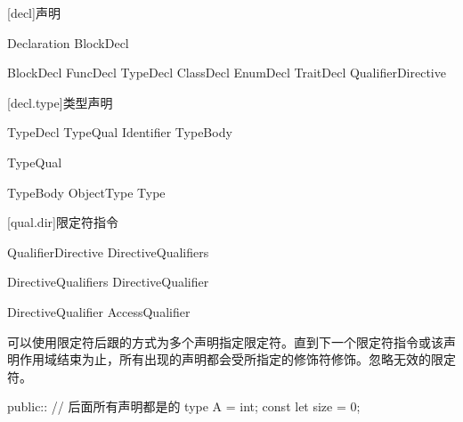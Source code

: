 
[decl]{声明}

\begin{bnf}{Declaration}
    BlockDecl
\end{bnf}

\begin{bnf}{BlockDecl}
    FuncDecl \br
    TypeDecl \br
    ClassDecl \br
    EnumDecl \br
    TraitDecl \br
    QualifierDirective
\end{bnf}

[decl.type]{类型声明}

\begin{bnf}{TypeDecl}
    TypeQual\bnfs {} Identifier TypeBody
\end{bnf}

\begin{bnf}{TypeQual}
\end{bnf}

\begin{bnf}{TypeBody}
    ObjectType \br
    \terminal{=} Type
\end{bnf}

[qual.dir]{限定符指令}

\begin{bnf}{QualifierDirective}
    DirectiveQualifiers \terminal{::}
\end{bnf}

\begin{bnf}{DirectiveQualifiers}
    DirectiveQualifier\bnfp
\end{bnf}

\begin{bnf}{DirectiveQualifier}
    AccessQualifier
\end{bnf}

\pnum
可以使用限定符后跟\tcode{::}的方式为多个声明指定限定符。直到下一个限定符指令或该声明作用域结束为止，所有出现的声明都会受所指定的修饰符修饰。忽略无效的限定符。

\enterexample
\begin{codeblock}
public:: // 后面所有声明都是的
type A = int;
const let size = 0;
\end{codeblock}